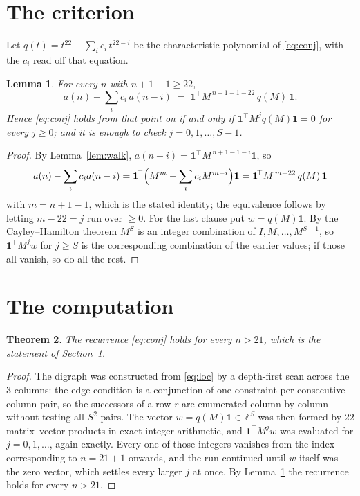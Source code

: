 \documentclass[11pt,a4paper]{article}
\theoremstyle{plain}
\newtheorem{theorem}{Theorem}
\newtheorem{lemma}[theorem]{Lemma}
\theoremstyle{definition}
\begin{document}
\section{The criterion}

Let $q(t)=t^{22}-\sum_i c_i\,t^{22-i}$ be the characteristic polynomial of
\eqref{eq:conj}, with the $c_i$ read off that equation.

\begin{lemma}\label{lem:crit}
For every $n$ with $n+1-1\ge22$,
\[
a(n)-\sum_i c_i\,a(n-i)\;=\;\mathbf{1}^{\!\top}M^{\,n+1-1-22}\,q(M)\,\mathbf{1} .
\]
Hence \eqref{eq:conj} holds from that point on if and only if
$\mathbf{1}^{\!\top}M^{j}q(M)\mathbf{1}=0$ for every $j\ge0$; and it is enough to check
$j=0,1,\dots,S-1$.
\end{lemma}

\begin{proof}
By Lemma~\ref{lem:walk}, $a(n-i)=\mathbf{1}^{\!\top}M^{\,n+1-1-i}\mathbf{1}$, so
\[
a(n)-\sum_i c_i a(n-i)
=\mathbf{1}^{\!\top}\Bigl(M^{m}-\sum_i c_i M^{m-i}\Bigr)\mathbf{1}
=\mathbf{1}^{\!\top}M^{\,m-22}\,q(M)\,\mathbf{1}
\]
with $m=n+1-1$, which is the stated identity; the equivalence follows by letting
$m-22=j$ run over $\ge0$. For the last clause put $w=q(M)\mathbf{1}$. By the
Cayley--Hamilton theorem $M^{S}$ is an integer combination of $I,M,\dots,M^{S-1}$, so
$\mathbf{1}^{\!\top}M^{j}w$ for $j\ge S$ is the corresponding combination of the earlier
values; if those all vanish, so do all the rest.
\end{proof}

\section{The computation}

\begin{theorem}
The recurrence \eqref{eq:conj} holds for every $n>21$, which is the statement of
Section~1.
\end{theorem}

\begin{proof}
The digraph was constructed from \eqref{eq:loc} by a depth-first scan across the $3$
columns: the edge condition is a conjunction of one constraint per consecutive column
pair, so the successors of a row $r$ are enumerated column by column without testing all
$S^2$ pairs. The vector $w=q(M)\mathbf{1}\in\mathbb{Z}^{S}$ was then formed by $22$
matrix--vector products in exact integer arithmetic, and $\mathbf{1}^{\!\top}M^{j}w$ was
evaluated for $j=0,1,\dots$, again exactly. Every one of those integers vanishes from the
index corresponding to $n=21+1$ onwards, and the run continued until $w$ itself was the
zero vector, which settles every larger $j$ at once. By Lemma~\ref{lem:crit} the recurrence
holds for every $n>21$.
\end{proof}
\end{document}

